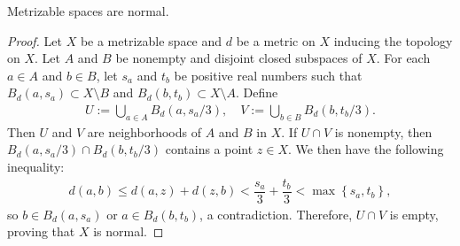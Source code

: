 \begin{thm}
    Metrizable spaces are normal.
\end{thm}
\begin{proof}
    Let $X$ be a metrizable space and $d$ be a metric on $X$ inducing the topology on $X$.
    Let $A$ and $B$ be nonempty and disjoint closed subspaces of $X$.
    For each $a\in A$ and $b\in B$, let $s_a$ and $t_b$ be positive real numbers such that $B_d(a, s_a)\subset X\setminus B$ and $B_d(b, t_b)\subset X\setminus A$.
    Define
    \begin{align*}
        U:=\bigcup_{a\in A}B_d(a, s_a/3),\quad V:=\bigcup_{b\in B}B_d(b, t_b/3).
    \end{align*}
    Then $U$ and $V$ are neighborhoods of $A$ and $B$ in $X$.
    If $U\cap V$ is nonempty, then $B_d(a, s_a/3)\cap B_d(b, t_b/3)$ contains a point $z\in X$.
    We then have the following inequality:
    \begin{align*}
        d(a, b)\leq d(a, z)+d(z, b)<\dfrac{s_a}{3}+\dfrac{t_b}{3}<\max\left\{s_a, t_b\right\},
    \end{align*}
    so $b\in B_d(a, s_a)$ or $a\in B_d(b, t_b)$, a contradiction.
    Therefore, $U\cap V$ is empty, proving that $X$ is normal.
\end{proof}

